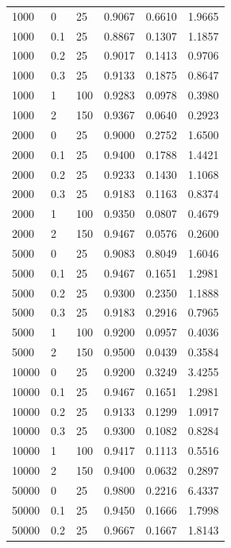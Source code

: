 \documentclass[11pt]{article}
\begin{document}
\begin{table}[htbp]
{\begin{tabular}{lll|lll}
        1000 & 0 & 25 & 0.9067 & 0.6610 & 1.9665 \\ 
        1000 & 0.1 & 25 & 0.8867 & 0.1307 & 1.1857 \\ 
        1000 & 0.2 & 25 & 0.9017 & 0.1413 & 0.9706 \\ 
        1000 & 0.3 & 25 & 0.9133 & 0.1875 & 0.8647 \\ 
        1000 & 1 & 100 & 0.9283 & 0.0978 & 0.3980 \\ 
        1000 & 2 & 150 & 0.9367 & 0.0640 & 0.2923 \\ 
        \midrule
        2000 & 0 & 25 & 0.9000 & 0.2752 & 1.6500 \\ 
        2000 & 0.1 & 25 & 0.9400 & 0.1788 & 1.4421 \\ 
        2000 & 0.2 & 25 & 0.9233 & 0.1430 & 1.1068 \\ 
        2000 & 0.3 & 25 & 0.9183 & 0.1163 & 0.8374 \\ 
        2000 & 1 & 100 & 0.9350 & 0.0807 & 0.4679 \\ 
        2000 & 2 & 150 & 0.9467 & 0.0576 & 0.2600 \\ 
        \midrule
        5000 & 0 & 25 & 0.9083 & 0.8049 & 1.6046 \\ 
        5000 & 0.1 & 25 & 0.9467 & 0.1651 & 1.2981 \\ 
        5000 & 0.2 & 25 & 0.9300 & 0.2350 & 1.1888 \\ 
        5000 & 0.3 & 25 & 0.9183 & 0.2916 & 0.7965 \\ 
        5000 & 1 & 100 & 0.9200 & 0.0957 & 0.4036 \\ 
        5000 & 2 & 150 & 0.9500 & 0.0439 & 0.3584 \\ 
        \midrule
        10000 & 0 & 25 & 0.9200 & 0.3249 & 3.4255 \\ 
        10000 & 0.1 & 25 & 0.9467 & 0.1651 & 1.2981 \\ 
        10000 & 0.2 & 25 & 0.9133 & 0.1299 & 1.0917 \\ 
        10000 & 0.3 & 25 & 0.9300 & 0.1082 & 0.8284 \\ 
        10000 & 1 & 100 & 0.9417 & 0.1113 & 0.5516 \\ 
        10000 & 2 & 150 & 0.9400 & 0.0632 & 0.2897 \\ 
        \midrule
        50000 & 0 & 25 & 0.9800 & 0.2216 & 6.4337 \\ 
        50000 & 0.1 & 25 & 0.9450 & 0.1666 & 1.7998 \\ 
        50000 & 0.2 & 25 & 0.9667 & 0.1667 & 1.8143 \\ 

\end{tabular}}
\end{table}
\end{document}
